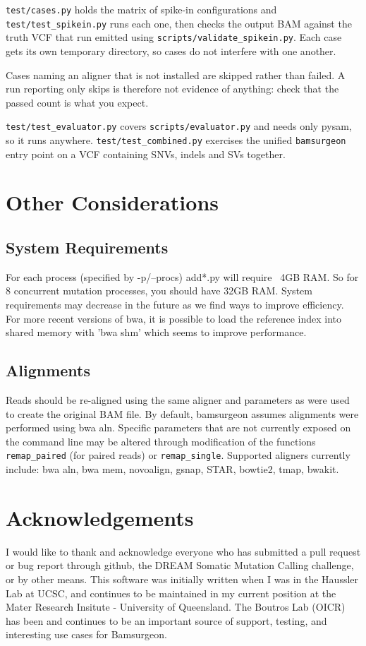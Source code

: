 \documentclass[letterpaper,11pt]{article}
\begin{document}
\texttt{test/cases.py} holds the matrix of spike-in configurations and
\texttt{test/test\_spikein.py} runs each one, then checks the output BAM
against the truth VCF that run emitted using
\texttt{scripts/validate\_spikein.py}. Each case gets its own temporary
directory, so cases do not interfere with one another.

Cases naming an aligner that is not installed are skipped rather than failed.
A run reporting only skips is therefore not evidence of anything: check that
the passed count is what you expect.

\texttt{test/test\_evaluator.py} covers \texttt{scripts/evaluator.py} and needs
only pysam, so it runs anywhere. \texttt{test/test\_combined.py} exercises the
unified \texttt{bamsurgeon} entry point on a VCF containing SNVs, indels and
SVs together.

\section{Other Considerations}
\subsection{System Requirements}
For each process (specified by -p/--procs) add*.py will require ~4GB RAM. So for 8 concurrent mutation processes, you should have 32GB RAM. System requirements may decrease in the future as we find ways to improve efficiency. For more recent versions of bwa, it is possible to load the reference index into shared memory with 'bwa shm' which seems to improve performance.

\subsection{Alignments}
Reads should be re-aligned using the same aligner and parameters as were used to create the original BAM file. By default, bamsurgeon assumes alignments were performed using bwa aln. Specific parameters that are not currently exposed on the command line may be altered through modification of the functions \texttt{remap\_paired} (for paired reads) or \texttt{remap\_single}. Supported aligners currently include: bwa aln, bwa mem, novoalign, gsnap, STAR, bowtie2, tmap, bwakit.

\section{Acknowledgements}
I would like to thank and acknowledge everyone who has submitted a pull request or bug report through github, the DREAM Somatic Mutation Calling challenge, or by other means. This software was initially written when I was in the Haussler Lab at UCSC, and continues to be maintained in my current position at the Mater Research Insitute - University of Queensland. The Boutros Lab (OICR) has been and continues to be an important source of support, testing, and interesting use cases for Bamsurgeon.
\end{document}
